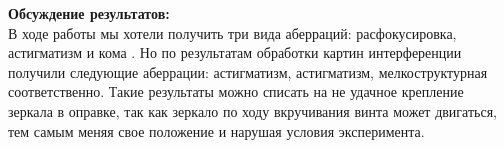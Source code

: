 \documentclass[a4paper, 12pt]{article}%
\begin{document}
\begin{enumerate}
	\end{enumerate}
	
	
	\textbf{Обсуждение результатов: }\\
	
	В ходе работы мы хотели получить три вида аберраций: расфокусировка, астигматизм и кома . Но по результатам обработки картин интерференции получили следующие аберрации: астигматизм, астигматизм, мелкоструктурная соответственно. Такие результаты можно списать на не удачное крепление зеркала в оправке, так как зеркало по ходу вкручивания винта может двигаться, тем самым меняя свое положение и нарушая условия эксперимента. 
	
\end{document}
